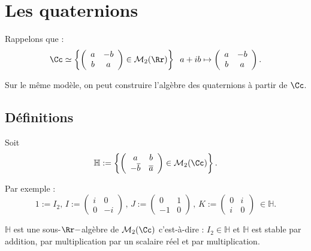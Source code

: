 \documentclass[class=report,crop=false]{standalone}
\newcommand{\iso}{\simeq}
\newcommand{\Hh}{\mathbb{H}}
\begin{document}
\section{Les quaternions}

Rappelons que :
\[\Cc \iso \left\{\left(\begin{array}{cc}
a & -b\\
b & a
\end{array}\right) \in \mathcal{M}_2(\Rr)\right\} \;\; a+ib \mapsto \left(\begin{array}{cc}
a & -b\\
b & a
\end{array}\right) .\]


Sur le même modèle, on peut construire l'algèbre des quaternions à partir de $\Cc$.

\subsection{Définitions}

\begin{definition}
Soit \[\Hh:=\left\{\left(\begin{array}{cc}
a & b\\
-\overline{b} & \overline{a}
\end{array}\right) \in\mathcal{M}_2(\Cc)\right\}.\]
\end{definition}

\begin{exemple}
Par exemple : \[1:=I_2 ,\, I:=\left(\begin{array}{cc}
i & 0\\
0 & -i
\end{array}\right)\,,\, J:=\left(\begin{array}{cc}
0 & 1\\
-1 & 0
\end{array}\right)\,,\, K:=\left(\begin{array}{cc}
0 & i\\
i & 0
\end{array}\right) \; \in \Hh.\]
\end{exemple}

\begin{proposition}
$\Hh$ est une sous-$\Rr-$algèbre de $\mathcal{M}_2(\Cc)$ c'est-à-dire :
$I_2 \in \Hh$ et $\Hh$ est stable par addition, par multiplication par un scalaire réel et par multiplication.
\end{proposition}
\end{document}
